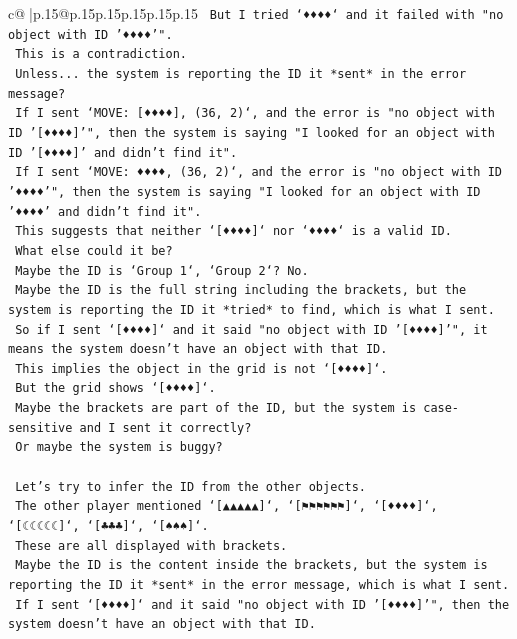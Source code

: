 \documentclass{article}
\begin{document}
{\begin{supertabular}{c@{$\;$}|p{.15\linewidth}@{}p{.15\linewidth}p{.15\linewidth}p{.15\linewidth}p{.15\linewidth}p{.15\linewidth}}
{{{\texttt{    But I tried `♦♦♦♦` and it failed with "no object with ID '♦♦♦♦'".} \\
\texttt{    This is a contradiction.} \\
\texttt{    Unless... the system is reporting the ID it *sent* in the error message?} \\
\texttt{    If I sent `MOVE: {[}♦♦♦♦{]}, (36, 2)`, and the error is "no object with ID '{[}♦♦♦♦{]}'", then the system is saying "I looked for an object with ID '{[}♦♦♦♦{]}' and didn't find it".} \\
\texttt{    If I sent `MOVE: ♦♦♦♦, (36, 2)`, and the error is "no object with ID '♦♦♦♦'", then the system is saying "I looked for an object with ID '♦♦♦♦' and didn't find it".} \\
\texttt{    This suggests that neither `{[}♦♦♦♦{]}` nor `♦♦♦♦` is a valid ID.} \\
\texttt{    What else could it be?} \\
\texttt{    Maybe the ID is `Group 1`, `Group 2`? No.} \\
\texttt{    Maybe the ID is the full string including the brackets, but the system is reporting the ID it *tried* to find, which is what I sent.} \\
\texttt{    So if I sent `{[}♦♦♦♦{]}` and it said "no object with ID '{[}♦♦♦♦{]}'", it means the system doesn't have an object with that ID.} \\
\texttt{    This implies the object in the grid is not `{[}♦♦♦♦{]}`.} \\
\texttt{    But the grid shows `{[}♦♦♦♦{]}`.} \\
\texttt{    Maybe the brackets are part of the ID, but the system is case{-}sensitive and I sent it correctly?} \\
\texttt{    Or maybe the system is buggy?} \\
\\ 
\texttt{    Let's try to infer the ID from the other objects.} \\
\texttt{    The other player mentioned `{[}▲▲▲▲▲{]}`, `{[}⚑⚑⚑⚑⚑⚑{]}`, `{[}♦♦♦♦{]}`, `{[}☾☾☾☾☾{]}`, `{[}♣♣♣{]}`, `{[}♠♠♠{]}`.} \\
\texttt{    These are all displayed with brackets.} \\
\texttt{    Maybe the ID is the content inside the brackets, but the system is reporting the ID it *sent* in the error message, which is what I sent.} \\
\texttt{    If I sent `{[}♦♦♦♦{]}` and it said "no object with ID '{[}♦♦♦♦{]}'", then the system doesn't have an object with that ID.} \\
}}}
\end{supertabular}}
\end{document}

